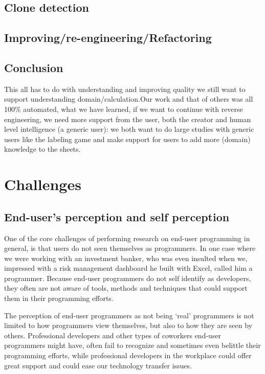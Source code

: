 \documentclass[conference]{IEEEtran}
\begin{document}
\subsection{Clone detection}

\subsection{Improving/re-engineering/Refactoring}


\subsection{Conclusion}
This all has to do with understanding and improving quality we still want to support understanding domain/calculation.Our work and that of others was all 100\% automated, what we have learned, if we want to continue with reverse engineering, we need more support from the user, both the creator and human level intelligence (a generic user): we both want to do large studies with generic users like the labeling game and make support for users to add more (domain) knowledge to the sheets.

\section{Challenges} 

\subsection{End-user's perception and self perception}
One of the core challenges of performing research on end-user programming in general, is that users do not seen themselves as programmers.  In one case where we were working with an investment banker, who was even insulted when we, impressed with a risk management dashboard he built with Excel, called him a programmer. Because end-user programmers do not self identify as developers, they often are not aware of tools, methods and techniques that could support them in their programming efforts.

The perception of end-user programmers as not being `real' programmers is not limited to how programmers view themselves, but also to how they are seen by others. Professional developers and other types of coworkers end-user programmers might have, often fail to recognize and sometimes even belittle their programming efforts, while professional developers in the workplace could offer great support and could ease our technology transfer issues.
\end{document}
